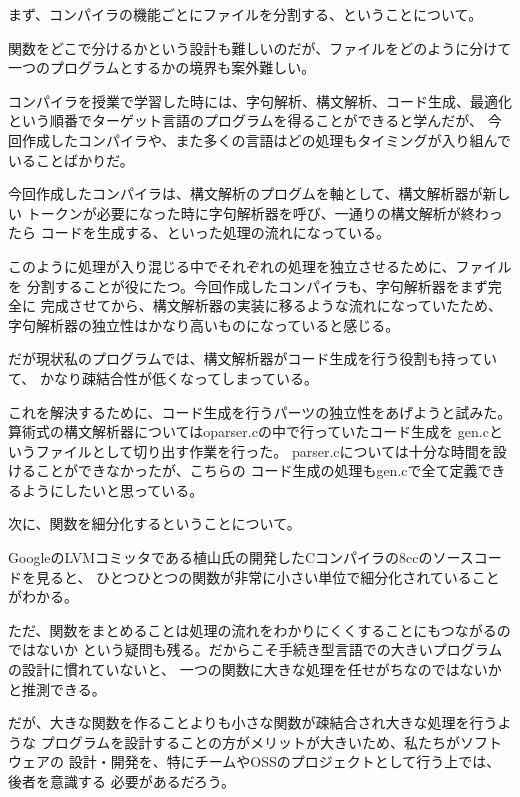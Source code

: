 \documentclass[11pt,a4j]{jarticle}
\begin{document}
まず、コンパイラの機能ごとにファイルを分割する、ということについて。

関数をどこで分けるかという設計も難しいのだが、ファイルをどのように分けて
一つのプログラムとするかの境界も案外難しい。

コンパイラを授業で学習した時には、字句解析、構文解析、コード生成、最適化
という順番でターゲット言語のプログラムを得ることができると学んだが、
今回作成したコンパイラや、また多くの言語はどの処理もタイミングが入り組んで
いることばかりだ。

今回作成したコンパイラは、構文解析のプログムを軸として、構文解析器が新しい
トークンが必要になった時に字句解析器を呼び、一通りの構文解析が終わったら
コードを生成する、といった処理の流れになっている。

このように処理が入り混じる中でそれぞれの処理を独立させるために、ファイルを
分割することが役にたつ。今回作成したコンパイラも、字句解析器をまず完全に
完成させてから、構文解析器の実装に移るような流れになっていたため、
字句解析器の独立性はかなり高いものになっていると感じる。

だが現状私のプログラムでは、構文解析器がコード生成を行う役割も持っていて、
かなり疎結合性が低くなってしまっている。

これを解決するために、コード生成を行うパーツの独立性をあげようと試みた。
算術式の構文解析器についてはoparser.cの中で行っていたコード生成を
gen.cというファイルとして切り出す作業を行った。
parser.cについては十分な時間を設けることができなかったが、こちらの
コード生成の処理もgen.cで全て定義できるようにしたいと思っている。

\vspace{0.2in}

次に、関数を細分化するということについて。

GoogleのLVMコミッタである植山氏の開発したCコンパイラの8ccのソースコードを見ると、
ひとつひとつの関数が非常に小さい単位で細分化されていることがわかる。

ただ、関数をまとめることは処理の流れをわかりにくくすることにもつながるのではないか
という疑問も残る。だからこそ手続き型言語での大きいプログラムの設計に慣れていないと、
一つの関数に大きな処理を任せがちなのではないかと推測できる。

だが、大きな関数を作ることよりも小さな関数が疎結合され大きな処理を行うような
プログラムを設計することの方がメリットが大きいため、私たちがソフトウェアの
設計・開発を、特にチームやOSSのプロジェクトとして行う上では、後者を意識する
必要があるだろう。


\newpage

\end{document}
